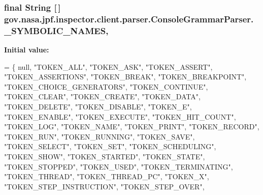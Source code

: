 \subsubsection[{\texorpdfstring{\+\_\+\+S\+Y\+M\+B\+O\+L\+I\+C\+\_\+\+N\+A\+M\+ES}{_SYMBOLIC_NAMES}}]{\setlength{\rightskip}{0pt plus 5cm}final String \mbox{[}$\,$\mbox{]} gov.\+nasa.\+jpf.\+inspector.\+client.\+parser.\+Console\+Grammar\+Parser.\+\_\+\+S\+Y\+M\+B\+O\+L\+I\+C\+\_\+\+N\+A\+M\+ES\hspace{0.3cm}{\ttfamily [static]}, {\ttfamily [private]}}\hypertarget{classgov_1_1nasa_1_1jpf_1_1inspector_1_1client_1_1parser_1_1_console_grammar_parser_abcc03573e93008f6785c7f6a74f5f332}{}\label{classgov_1_1nasa_1_1jpf_1_1inspector_1_1client_1_1parser_1_1_console_grammar_parser_abcc03573e93008f6785c7f6a74f5f332}
{\bfseries Initial value\+:}
\begin{DoxyCode}
= \{
    null, \textcolor{stringliteral}{"TOKEN\_ALL"}, \textcolor{stringliteral}{"TOKEN\_ASK"}, \textcolor{stringliteral}{"TOKEN\_ASSERT"}, \textcolor{stringliteral}{"TOKEN\_ASSERTIONS"}, \textcolor{stringliteral}{"TOKEN\_BREAK"}, 
    \textcolor{stringliteral}{"TOKEN\_BREAKPOINT"}, \textcolor{stringliteral}{"TOKEN\_CHOICE\_GENERATORS"}, \textcolor{stringliteral}{"TOKEN\_CONTINUE"}, \textcolor{stringliteral}{"TOKEN\_CLEAR"}, 
    \textcolor{stringliteral}{"TOKEN\_CREATE"}, \textcolor{stringliteral}{"TOKEN\_DATA"}, \textcolor{stringliteral}{"TOKEN\_DELETE"}, \textcolor{stringliteral}{"TOKEN\_DISABLE"}, \textcolor{stringliteral}{"TOKEN\_E"}, 
    \textcolor{stringliteral}{"TOKEN\_ENABLE"}, \textcolor{stringliteral}{"TOKEN\_EXECUTE"}, \textcolor{stringliteral}{"TOKEN\_HIT\_COUNT"}, \textcolor{stringliteral}{"TOKEN\_LOG"}, \textcolor{stringliteral}{"TOKEN\_NAME"}, 
    \textcolor{stringliteral}{"TOKEN\_PRINT"}, \textcolor{stringliteral}{"TOKEN\_RECORD"}, \textcolor{stringliteral}{"TOKEN\_RUN"}, \textcolor{stringliteral}{"TOKEN\_RUNNING"}, \textcolor{stringliteral}{"TOKEN\_SAVE"}, 
    \textcolor{stringliteral}{"TOKEN\_SELECT"}, \textcolor{stringliteral}{"TOKEN\_SET"}, \textcolor{stringliteral}{"TOKEN\_SCHEDULING"}, \textcolor{stringliteral}{"TOKEN\_SHOW"}, \textcolor{stringliteral}{"TOKEN\_STARTED"}, 
    \textcolor{stringliteral}{"TOKEN\_STATE"}, \textcolor{stringliteral}{"TOKEN\_STOPPED"}, \textcolor{stringliteral}{"TOKEN\_USED"}, \textcolor{stringliteral}{"TOKEN\_TERMINATING"}, \textcolor{stringliteral}{"TOKEN\_THREAD"}, 
    \textcolor{stringliteral}{"TOKEN\_THREAD\_PC"}, \textcolor{stringliteral}{"TOKEN\_X"}, \textcolor{stringliteral}{"TOKEN\_STEP\_INSTRUCTION"}, \textcolor{stringliteral}{"TOKEN\_STEP\_OVER"}, 

\end{DoxyCode}
